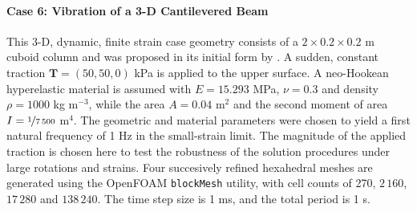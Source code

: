 \documentclass[sn-mathphys,Numbered]{sn-jnl}%
\newcommand{\bb}{\boldsymbol}
\begin{document}
\paragraph{Case 6: Vibration of a 3-D Cantilevered Beam}
This 3-D, dynamic, finite strain case geometry consists of a $2 \times 0.2 \times 0.2$ m cuboid column and was proposed in its initial form by \citet{Tukovic2007}.
A sudden, constant traction $\bb{T} = \left(50, 50, 0 \right)$ kPa is applied to the upper surface.
A neo-Hookean hyperelastic material is assumed with $E = 15.293$ MPa, $\nu = 0.3$ and density $\rho = 1000$ kg m$^{-3}$, while the area $A = 0.04$ m$^2$ and the second moment of area $I = \nicefrac{1}{7\,500}$ m$^4$. %
The geometric and material parameters were chosen to yield a first natural frequency of 1 Hz in the small-strain limit.
The magnitude of the applied traction is chosen here to test the robustness of the solution procedures under large rotations and strains.
Four succesively refined hexahedral meshes are generated using the OpenFOAM \texttt{blockMesh} utility, with cell counts of 270, $2\,160$, $17\,280$ and $138\,240$.
The time step size is 1 ms, and the total period is 1 s.
\end{document}
